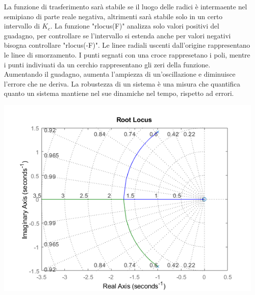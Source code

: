 \documentclass{article}
\numberwithin{equation}{subsection}
\begin{document}
La funzione di trasferimento sarà stabile se il luogo delle radici è intermaente nel semipiano di parte reale negativa, altrimenti sarà stabile solo 
in un certo intervallo di $K_c$. La funzione "rlocus(F)" analizza solo valori positivi del guadagno, per controllare se l'intervallo si estenda anche per 
valori negativi bisogna controllare "rlocus(-F)". Le linee radiali uscenti dall'origine rappresentano le linee di smorzamento. 
I punti segnati con una croce rappresetano i poli, mentre i punti indiviuati da un cerchio rappresentano gli zeri della funzione.\\
Aumentando il guadagno, aumenta l'ampiezza di un'oscillazione e diminuisce l'errore che ne deriva. La robustezza di un sistema è una misura che 
quantifica quanto un sistema mantiene nel sue dinamiche nel tempo, rispetto ad errori. 

\begin{center}
    \includegraphics[scale=0.55]{rlocus}
\end{center}
\end{document}
